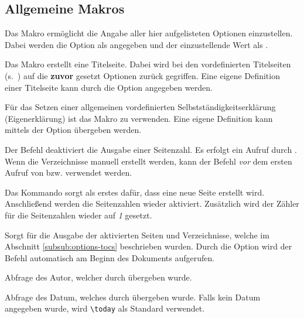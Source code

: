 \documentclass[babel=ngerman,highlight=false]{skdoc}
\begin{document}
            \begin{sourcecode}
\renewcommand{\listappendixname}{Anhangsverzeichnis}
            \end{sourcecode}


        \subsection{Allgemeine Makros}\label{subsec:macro}
            \DescribeMacro{} Das Makro ermöglicht die Angabe aller hier aufgelisteten Optionen einzustellen. Dabei werden die Option als  angegeben und der einzustellende Wert als .

            \DescribeMacro\dhbwtitlepage{} Das Makro erstellt eine Titelseite. Dabei wird bei den vordefinierten Titelseiten (s.~) auf die \textbf{zuvor} gesetzt Optionen zurück gegriffen. Eine eigene Definition einer Titelseite kann durch die Option  angegeben werden.

            \DescribeMacro\dhbwdeclaration{} Für das Setzen einer allgemeinen vordefinierten Selbstständigkeitserklärung (Eigenerklärung) ist das Makro zu verwenden. Eine eigene Definition kann mittels der Option  übergeben werden.

            \DescribeMacro\dhbwfrontmatter{} Der Befehl deaktiviert die Ausgabe einer Seitenzahl. Es erfolgt ein Aufruf durch \Macro\dhbwprintintro. Wenn die Verzeichnisse manuell erstellt werden, kann der Befehl \textit{vor} dem ersten Aufruf von  bzw.  verwendet werden.

            \DescribeMacro\dhbwmainmatter{} Das Kommando sorgt als erstes dafür, dass eine neue Seite erstellt wird. Anschließend werden die Seitenzahlen wieder aktiviert. Zusätzlich wird der Zähler für die Seitenzahlen wieder auf \textit{1} gesetzt.

            \DescribeMacro\dhbwprintintro{} Sorgt für die Ausgabe der aktivierten Seiten und Verzeichnisse, welche im Abschnitt \ref{subsub:options-tocs} beschrieben wurden. Durch die Option  wird der Befehl automatisch am Beginn des Dokuments aufgerufen.

            \DescribeMacro\getAuthor Abfrage des Autor, welcher durch  übergeben wurde.

            \DescribeMacro\getDate Abfrage des Datum, welches durch  übergeben wurde. Falls kein Datum angegeben wurde, wird \verb|\today| als Standard verwendet.
\end{document}
